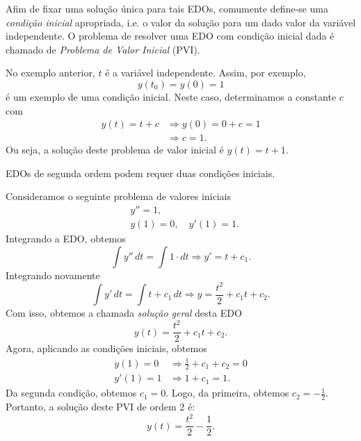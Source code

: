 Afim de fixar uma solução única para tais EDOs, comumente define-se uma \emph{condição inicial} apropriada, i.e. o valor da solução para um dado valor da variável independente. O problema de resolver uma EDO com condição inicial dada é chamado de \emph{Problema de Valor Inicial} (PVI).

\begin{ex}
  No exemplo anterior, $t$ é a variável independente. Assim, por exemplo,
\begin{equation}
  y(t_0) = y(0) = 1
\end{equation}
é um exemplo de uma condição inicial. Neste caso, determinamos a constante $c$ com
\begin{align}
  y(t) = t + c &\Rightarrow y(0) = 0 + c = 1 \\
               &\Rightarrow c = 1.
\end{align}
Ou seja, a solução deste problema de valor inicial é $y(t) = t + 1$.
\end{ex}


EDOs de segunda ordem podem requer duas condições iniciais.

\begin{ex}
Consideramos o seguinte problema de valores iniciais
\begin{align}
  &y'' = 1,\\
  &y(1) = 0,\quad y'(1) = 1.
\end{align}
Integrando a EDO, obtemos
\begin{equation}
  \int y''\,dt = \int 1\cdot dt \Rightarrow y' = t + c_1.
\end{equation}
Integrando novamente
\begin{equation}
  \int y'\,dt = \int t + c_1\,dt \Rightarrow y = \frac{t^2}{2} + c_1t + c_2.
\end{equation}
Com isso, obtemos a chamada \emph{solução geral} desta EDO
\begin{equation}
  y(t) = \frac{t^2}{2} + c_1t + c_2.
\end{equation}
Agora, aplicando as condições iniciais, obtemos
\begin{align}
  y(1) = 0 &\Rightarrow \frac{1}{2} + c_1 + c_2 = 0\\
  y'(1) = 1 &\Rightarrow 1 + c_1 = 1.
\end{align}
Da segunda condição, obtemos $c_1 = 0$. Logo, da primeira, obtemos $c_2 = -\frac{1}{2}$. Portanto, a solução deste PVI de ordem 2 é:
\begin{equation}
  y(t) = \frac{t^2}{2} - \frac{1}{2}.
\end{equation}
\end{ex}


